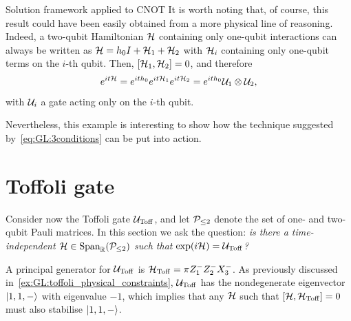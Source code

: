 \begin{examplebox}[label={ex:GL:cnot_with_conditions}]{Solution framework applied to CNOT}
It is worth noting that, of course, this result could have been easily obtained from a more physical line of reasoning. Indeed, a two-qubit Hamiltonian ${\mathcal{H}}$ containing only one-qubit interactions can always be written as ${\mathcal{H}}=h_0 I+{\mathcal{H}}_1+{\mathcal{H}}_2$ with ${\mathcal{H}}_i$ containing only one-qubit terms on the $i$-th qubit. Then, $[{\mathcal{H}}_1,{\mathcal{H}}_2]=0$, and therefore
\begin{equation}
    e^{it{\mathcal{H}}}=e^{it h_0}e^{it{\mathcal{H}}_1}e^{it{\mathcal{H}}_2}=e^{it h_0} {\mathcal{U}}_1\otimes{\mathcal{U}}_2,
\end{equation}
with ${\mathcal{U}}_i$ a gate acting only on the $i$-th qubit.

Nevertheless, this example is interesting to show how the technique suggested by~\cref{eq:GL:3conditions} can be put into action.
\end{examplebox}


\section{Toffoli gate}
\label{sec:GL:toffoli}

Consider now the Toffoli gate ${\mathcal{U}}_{\operatorname{Toff}}$, and let ${\mathcal{P}}_{\le2}$ denote the set of one- and two-qubit Pauli matrices. In this section we ask the question: \emph{is there a time-independent ${\mathcal{H}}\in\operatorname{Span}_{{\mathbb{R}}}({\mathcal{P}}_{\le2})$ such that $\exponential(i\calH)=\UToff$?}

A principal generator for ${\mathcal{U}}_{\operatorname{Toff}}$ is ${\mathcal{H}}_{\operatorname{Toff}}=\pi Z_1^- Z_2^- X_3^-$.
As previously discussed in~\cref{ex:GL:toffoli_physical_constraints}, ${\mathcal{U}}_{\operatorname{Toff}}$ has the nondegenerate eigenvector $\ket{1,1,-}$ with eigenvalue $-1$, which implies that any ${\mathcal{H}}$ such that $[{\mathcal{H}},{\mathcal{H}}_{\operatorname{Toff}}]=0$ must also stabilise $\ket{1,1,-}$.

